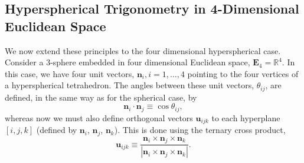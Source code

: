 \documentclass[fleqn,11pt,twoside]{article}
\theoremstyle{definition}
\begin{document}
\subsection{Hyperspherical Trigonometry in 4-Dimensional Euclidean Space}



We now extend these principles to the four dimensional hyperspherical case. Consider a $3$-sphere embedded in four dimensional Euclidean space, $\mathbf{E}_4=\mathbb{R}^4$. In this case, we have four unit vectors, $\textbf{n}_i, i=1,\dots,4$ pointing to the four vertices of a hyperspherical tetrahedron. The angles between these unit vectors, $\theta_{ij}$, are defined, in the same way as for the spherical case, by
\begin{equation}
\textbf{n}_i\cdot\textbf{n}_j\equiv\cos\theta_{ij},
\end{equation}
whereas now we must also define orthogonal vectors $\textbf{u}_{ijk}$ to each hyperplane $[i,j,k]$ (defined by $\mathbf{n}_i$, $\mathbf{n}_j$, $\mathbf{n}_k$). This is done using the ternary cross product,
\begin{equation}
\textbf{u}_{ijk}\equiv\frac
{\textbf{n}_i\times\textbf{n}_j\times\textbf{n}_k}
{\left|\textbf{n}_i\times\textbf{n}_j\times\textbf{n}_k\right|}.
\end{equation}
\end{document}
